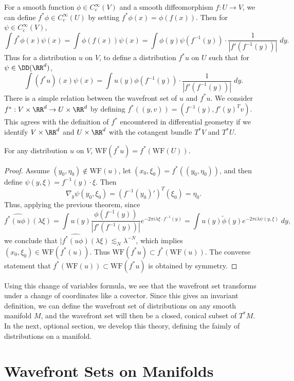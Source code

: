 For a smooth function $\phi \in C_c^\infty(V)$ and a smooth diffeomorphism $f: U \to V$, we can define $f^* \phi \in C_c^\infty(U)$ by setting $f^* \phi(x) = \phi(f(x))$. Then for $\psi \in C_c^\infty(V)$,
%
\[ \int f^* \phi(x) \psi(x) = \int \phi(f(x)) \psi(x) = \int \phi(y) \psi(f^{-1}(y)) \cdot \frac{1}{|f'(f^{-1}(y))|} \; dy. \]
%
Thus for a distribution $u$ on $V$, to define a distribution $f^* u$ on $U$ such that for $\psi \in \DD(\RR^d)$,
%
\[ \int (f^* u)(x) \psi(x) = \int u(y) \phi(f^{-1}(y)) \cdot \frac{1}{|f'(f^{-1}(y))|}\; dy. \]
%
There is a simple relation between the wavefront set of $u$ and $f^* u$. We consider $f^*: V \times \RR^d \to U \times \RR^d$ by defining $f^*((y,v)) = (f^{-1}(y), f'(y)^T v)$. This agrees with the definition of $f^*$ encountered in differential geometry if we identify $V \times \RR^d$ and $U \times \RR^d$ with the cotangent bundle $T^* V$ and $T^* U$.

\begin{theorem}
    For any distribution $u$ on $V$, $\text{WF}(f^* u) = f^*(\text{WF}(U))$.
\end{theorem}
\begin{proof}
    Assume $(y_0,\eta_0) \not \in \text{WF}(u)$, let $(x_0,\xi_0) = f^*((y_0,\eta_0))$, and then define $\psi(y,\xi) = f^{-1}(y) \cdot \xi$. Then
    \[ \nabla_y \psi(y_0,\xi_0) = (f^{-1}(y_0)')^T(\xi_0) = \eta_0. \]
    Thus, applying the previous theorem, since
    \[ \widehat{f^*(u \phi)}(\lambda \xi) = \int u(y) \frac{\phi(f^{-1}(y))}{|f'(f^{-1}(y))|} e^{-2 \pi i \lambda \xi \cdot f^{-1}(y)} = \int u(y) \tilde{\phi}(y) e^{-2 \pi i \lambda \psi(y,\xi)}\; dy, \]
    we conclude that $|\widehat{f^*(u \phi)}(\lambda \xi) \lesssim_N \lambda^{-N}$, which implies $(x_0,\xi_0) \in \text{WF}(f^*(u))$. Thus $\text{WF}(f^* u) \subset f^*(\text{WF}(u))$. The converse statement that $f^*(\text{WF}(u)) \subset \text{WF}(f^* u)$ is obtained by symmetry.
\end{proof}

Using this change of variables formula, we see that the wavefront set transforms under a change of coordinates like a covector. Since this gives an invariant definition, we can define the wavefront set of distributions on any smooth manifold $M$, and the wavefront set will then be a closed, conical subset of $T^* M$. In the next, optional section, we develop this theory, defining the faimly of distributions on a manifold.

\section{Wavefront Sets on Manifolds}

